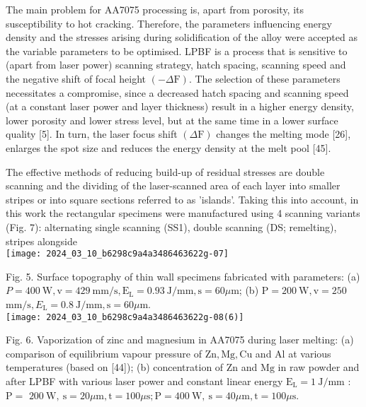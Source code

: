 \documentclass[10pt]{article}
\begin{document}
The main problem for AA7075 processing is, apart from porosity, its susceptibility to hot cracking. Therefore, the parameters influencing energy density and the stresses arising during solidification of the alloy were accepted as the variable parameters to be optimised. LPBF is a process that is sensitive to (apart from laser power) scanning strategy, hatch spacing, scanning speed and the negative shift of focal height $(-\Delta \mathrm{F})$. The selection of these parameters necessitates a compromise, since a decreased hatch spacing and scanning speed (at a constant laser power and layer thickness) result in a higher energy density, lower porosity and lower stress level, but at the same time in a lower surface quality [5]. In turn, the laser focus shift $(\Delta \mathrm{F})$ changes the melting mode [26], enlarges the spot size and reduces the energy density at the melt pool [45].

The effective methods of reducing build-up of residual stresses are double scanning and the dividing of the laser-scanned area of each layer into smaller stripes or into square sections referred to as 'islands'. Taking this into account, in this work the rectangular specimens were manufactured using 4 scanning variants (Fig. 7): alternating single scanning (SS1), double scanning (DS; remelting), stripes alongside\\
\texttt{[image: 2024\_03\_10\_b6298c9a4a3486463622g-07]}

Fig. 5. Surface topography of thin wall specimens fabricated with parameters: (a) $P=400 \mathrm{~W}, \mathrm{v}=429 \mathrm{~mm} / \mathrm{s}, \mathrm{E}_{\mathrm{L}}=0.93 \mathrm{~J} / \mathrm{mm}, \mathrm{s}=60 \mu \mathrm{m}$; (b) $\mathrm{P}=200 \mathrm{~W}, \mathrm{v}=250$ $\mathrm{mm} / \mathrm{s}, E_{\mathrm{L}}=0.8 \mathrm{~J} / \mathrm{mm}, \mathrm{s}=60 \mu \mathrm{m}$.\\
\texttt{[image: 2024\_03\_10\_b6298c9a4a3486463622g-08(6)]}

Fig. 6. Vaporization of zinc and magnesium in AA7075 during laser melting: (a) comparison of equilibrium vapour pressure of $\mathrm{Zn}, \mathrm{Mg}, \mathrm{Cu}$ and $\mathrm{Al}$ at various temperatures (based on [44]); (b) concentration of $\mathrm{Zn}$ and $\mathrm{Mg}$ in raw powder and after LPBF with various laser power and constant linear energy $\mathrm{E}_{\mathrm{L}}=1 \mathrm{~J} / \mathrm{mm}$ : $\mathrm{P}=$ $200 \mathrm{~W}, \mathrm{~s}=20 \mu \mathrm{m}, \mathrm{t}=100 \mu \mathrm{s} ; \mathrm{P}=400 \mathrm{~W}, \mathrm{~s}=40 \mu \mathrm{m}, \mathrm{t}=100 \mu \mathrm{s}$.
\end{document}
